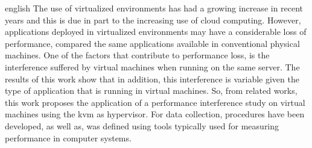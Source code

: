 \begin{resumo}[Abstract]
 \begin{otherlanguage*}{english}
The use of virtualized environments has had a growing increase in recent years and this is due in part to the increasing use of cloud computing. However, applications deployed in virtualized environments may have a considerable loss of performance, compared the same applications available in conventional physical machines. One of the factors that contribute to performance loss, is the interference suffered by virtual machines when running on the same server. The results of this work show that in addition, this interference is variable given the type of application that is running in virtual machines. So, from related works, this work proposes the application of a performance interference study on virtual machines using the kvm as hypervisor. For data collection, procedures have been developed, as well as, was defined using tools typically used for measuring performance in computer systems. %







\end{otherlanguage*}
\end{resumo}
